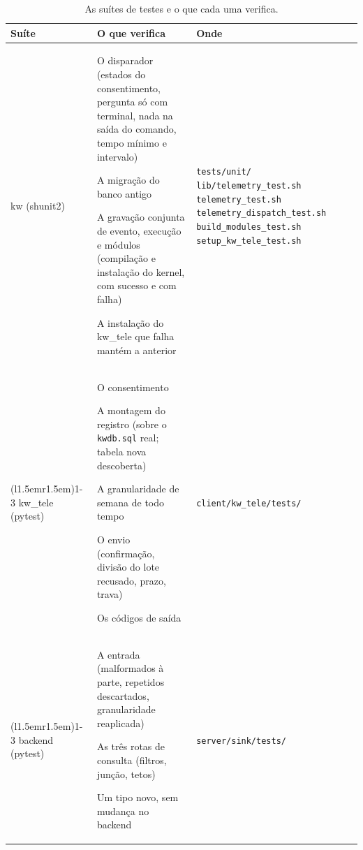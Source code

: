 \begin{table}[htbp]
  \centering
  \caption{As suítes de testes e o que cada uma verifica.}
  \label{tab:suites-teste}
  \providecommand{\kwarq}{}\renewcommand{\kwarq}[1]{\newline\hspace*{1em}\texttt{#1}}%
  \begin{tabular}{@{}>{\raggedright\arraybackslash}p{}%
      >{\raggedright\arraybackslash\hyphenpenalty=10000\everypar{\hangindent=1em\hangafter=1}}%
      p{}%
      >{\raggedright\arraybackslash}p{}@{}}
    \toprule
    Suíte & O que verifica & Onde \\
    \midrule
    kw \newline (shunit2)
      & O disparador (estados do consentimento, pergunta só com terminal, nada na saída do comando, tempo mínimo e
        intervalo)\par
        A migração do banco antigo\par
        A gravação conjunta de evento, execução e módulos (compilação e instalação do kernel, com sucesso e com
        falha)\par
        A instalação do kw\_tele que falha mantém a anterior
      & \texttt{tests/unit/}
        \kwarq{lib/telemetry\_test.sh}
        \kwarq{telemetry\_test.sh}
        \kwarq{telemetry\_dispatch\_test.sh}
        \kwarq{build\_modules\_test.sh}
        \kwarq{setup\_kw\_tele\_test.sh} \\
    \cmidrule(l{1.5em}r{1.5em}){1-3}
    kw\_tele \newline (pytest)
      & O consentimento\par
        A montagem do registro (sobre o \texttt{kwdb.sql} real; tabela nova descoberta)\par
        A granularidade de semana de todo tempo\par
        O envio (confirmação, divisão do lote recusado, prazo, trava)\par
        Os códigos de saída
      & \texttt{client/kw\_tele/tests/} \\
    \cmidrule(l{1.5em}r{1.5em}){1-3}
    backend \newline (pytest)
      & A entrada (malformados à parte, repetidos descartados, granularidade reaplicada)\par
        As três rotas de consulta (filtros, junção, tetos)\par
        Um tipo novo, sem mudança no backend
      & \texttt{server/sink/tests/} \\
    \bottomrule
  \end{tabular}
\end{table}

